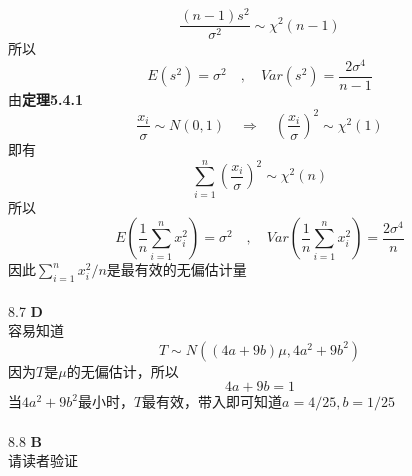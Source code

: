 \documentclass[a4paper]{ctexart}    %
\begin{document}
	\begin{equation*}
		\frac{(n-1)s^2}{\sigma^2} \sim \chi^2(n-1)
	\end{equation*}
	所以
	\begin{equation*}
		E(s^2) = \sigma^2 \quad , \quad Var(s^2) = \frac{2 \sigma^4}{n-1}
	\end{equation*}
	由\textbf{定理5.4.1}
	\begin{equation*}
		\frac{x_i}{\sigma} \sim N(0, 1) \quad \Rightarrow \quad \left(\frac{x_i}{\sigma}\right)^2 \sim \chi^2(1)
	\end{equation*}
	即有
	\begin{equation*}
		\sum\limits_{i=1}^{n} \left(\frac{x_i}{\sigma}\right)^2 \sim \chi^2(n)
	\end{equation*}
	所以
	\begin{equation*}
		E\left(\frac{1}{n} \sum\limits_{i=1}^{n} x_i^2 \right) = \sigma^2 \quad , \quad Var\left(\frac{1}{n} \sum\limits_{i=1}^{n} x_i^2 \right) = \frac{2 \sigma^4}{n}
	\end{equation*}
	因此$ \sum\limits_{i=1}^{n} x_i^2 / n $是最有效的无偏估计量 \\ \\
	8.7 \quad \textbf{D} \\
	容易知道
	\begin{equation*}
		T \sim N((4a+9b)\mu, 4a^2+9b^2)
	\end{equation*}
	因为$ T $是$ \mu $的无偏估计，所以
	\begin{equation*}
		4a + 9b = 1
	\end{equation*}
	当$ 4a^2+9b^2 $最小时，$ T $最有效，带入即可知道$ a = 4/25, b= 1/ 25 $ \\ \\
	8.8 \quad \textbf{B} \\
	请读者验证
	\newpage
\end{document}
